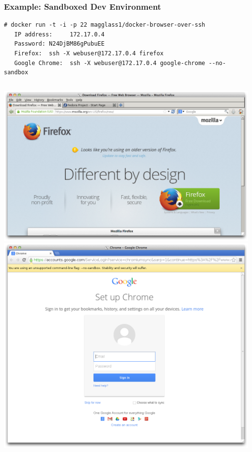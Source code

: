 \documentclass[xcolor=dvipsnames]{beamer}
\begin{document}
\begin{frame}[fragile]
  \frametitle{Example: Sandboxed Dev Environment}
  \begin{lstlisting}[basicstyle=\tiny]
   # docker run -t -i -p 22 magglass1/docker-browser-over-ssh
   IP address:     172.17.0.4
   Password: N24DjBM86gPubuEE
   Firefox:  ssh -X webuser@172.17.0.4 firefox
   Google Chrome:  ssh -X webuser@172.17.0.4 google-chrome --no-sandbox
  \end{lstlisting}
  \begin{columns}
  \includegraphics[width=\textwidth]{figures/firefox.png}
  \includegraphics[width=\textwidth]{figures/chrome.png}
  \end{columns}
\end{frame}
\end{document}

